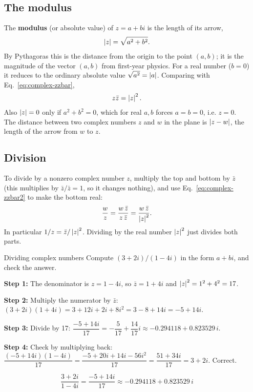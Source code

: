 \subsection{The modulus}

The \textbf{modulus} (or absolute value) of $z=a+bi$ is the length of its arrow,
\begin{equation}
\left\lvert z\right\rvert=\sqrt{a^2+b^2}.\label{eq:complex-modulus}
\end{equation}
By Pythagoras this is the distance from the origin to the point $(a,b)$; it is the magnitude of the vector $(a,b)$ from first-year physics. For a real number ($b=0$) it reduces to the ordinary absolute value $\sqrt{a^2}=\left\lvert a\right\rvert$. Comparing with Eq.~\eqref{eq:complex-zzbar},
\begin{equation}
z\bar z=\left\lvert z\right\rvert^2.\label{eq:complex-zzbar2}
\end{equation}
Also $\left\lvert z\right\rvert=0$ only if $a^2+b^2=0$, which for real $a,b$ forces $a=b=0$, i.e. $z=0$. The distance between two complex numbers $z$ and $w$ in the plane is $\left\lvert z-w\right\rvert$, the length of the arrow from $w$ to $z$.

\subsection{Division}

To divide by a nonzero complex number $z$, multiply the top and bottom by $\bar z$ (this multiplies by $\bar z/\bar z=1$, so it changes nothing), and use Eq.~\eqref{eq:complex-zzbar2} to make the bottom real:
\begin{equation}
\frac{w}{z}=\frac{w\,\bar z}{z\,\bar z}=\frac{w\,\bar z}{\left\lvert z\right\rvert^2}.\label{eq:complex-div}
\end{equation}
In particular $1/z=\bar z/\left\lvert z\right\rvert^2$. Dividing by the real number $\left\lvert z\right\rvert^2$ just divides both parts.

\begin{sample}{Dividing complex numbers}
Compute $(3+2i)/(1-4i)$ in the form $a+bi$, and check the answer.

\textbf{Step 1:} The denominator is $z=1-4i$, so $\bar z=1+4i$ and $\left\lvert z\right\rvert^2=1^2+4^2=17$.

\textbf{Step 2:} Multiply the numerator by $\bar z$: $(3+2i)(1+4i)=3+12i+2i+8i^2=3-8+14i=-5+14i$.

\textbf{Step 3:} Divide by 17: $\dfrac{-5+14i}{17}=-\dfrac{5}{17}+\dfrac{14}{17}i\approx-0.294118+0.823529\,i$.

\textbf{Step 4:} Check by multiplying back: $\dfrac{(-5+14i)(1-4i)}{17}=\dfrac{-5+20i+14i-56i^2}{17}=\dfrac{51+34i}{17}=3+2i$. Correct.

\[
\boxed{\frac{3+2i}{1-4i}=\frac{-5+14i}{17}\approx-0.294118+0.823529\,i}
\]
\end{sample}

